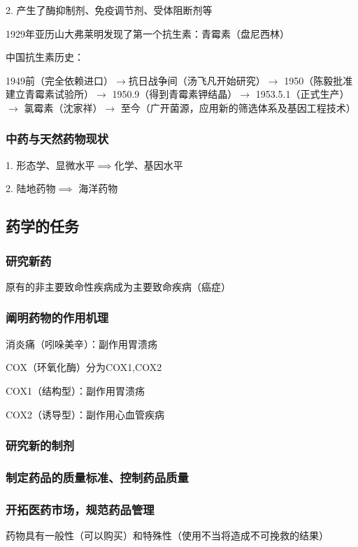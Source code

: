 2. 产生了酶抑制剂、免疫调节剂、受体阻断剂等
\begin{notation}
    1929年亚历山大弗莱明发现了第一个抗生素：青霉素（盘尼西林）

    中国抗生素历史：

    1949前（完全依赖进口）$\to $抗日战争间（汤飞凡开始研究）$\to $ 1950（陈毅批准建立青霉素试验所）$\to $ 1950.9（得到青霉素钾结晶）$\to $ 1953.5.1（正式生产）$\to $ 氯霉素（沈家祥）$\to $ 至今（广开菌源，应用新的筛选体系及基因工程技术）
\end{notation}

\subsubsection*{中药与天然药物现状}%
\label{subsub:中药与天然药物现状}
1. 形态学、显微水平$\implies$化学、基因水平

2. 陆地药物$\implies $ 海洋药物
\subsection{药学的任务}%
\label{sub:药学的任务}
\subsubsection*{研究新药}%
\label{subsub:研究新药}
原有的非主要致命性疾病成为主要致命疾病（癌症）

\subsubsection*{阐明药物的作用机理}%
\label{subsub:阐明药物的作用机理}
\begin{eg}
    消炎痛（吲哚美辛）：副作用胃溃疡

    COX（环氧化酶）分为COX1,COX2

    COX1（结构型）：副作用胃溃疡

    COX2（诱导型）：副作用心血管疾病
\end{eg}
\subsubsection*{研究新的制剂}%
\label{subsub:研究新的制剂}
\subsubsection*{制定药品的质量标准、控制药品质量}%
\label{subsub:制定药品的质量标准、控制药品质量}
\subsubsection*{开拓医药市场，规范药品管理}%
\label{subsub:开拓医药市场，规范药品管理}
药物具有一般性（可以购买）和特殊性（使用不当将造成不可挽救的结果）

